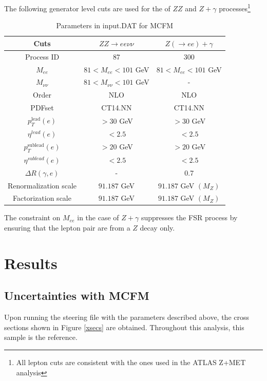 \documentclass[11pt,a4paper,final]{report}
\begin{document}
The following generator level cuts are used for the of $ZZ$ and $Z+\gamma$ processes\footnote{All lepton cuts are consistent with the ones used in the ATLAS Z+MET analysis}
\begin{table}[H]
\begin{center}
	\begin{tabular}{|c|c|c|}
	\hline
	\textbf{Cuts} &$ZZ \rightarrow ee\nu\nu$ & $Z(\rightarrow ee)+\gamma$\\
	\hline
	Process ID & 87 & 300\\
	$M_{ee}$ & $81 < M_{ee} < 101$ GeV & $81 < M_{ee} < 101$ GeV\\
	$M_{\nu\nu}$ & $81 < M_{\nu\nu} < 101$ GeV& -\\
	Order & NLO & NLO\\
	PDFset & CT14.NN & CT14.NN\\
	$p_T^{\text{lead}}(e)$ & $> 30$ GeV & $> 30$ GeV\\
	$\eta^{lead}(e)$ & $< 2.5$ & $< 2.5$\\
	$p_T^{\text{sublead}}(e)$ & $> 20$ GeV & $> 20$ GeV\\
	$\eta^{sublead}(e)$ & $< 2.5$ & $< 2.5$\\
	$\Delta R(\gamma,e)$ & - & 0.7\\
	Renormalization scale & $91.187$ GeV & $91.187$ GeV $(M_{Z})$\\
	Factorization scale & $91.187$ GeV & $91.187$ GeV $(M_{Z})$\\
	\hline
	\end{tabular}
	\caption{Parameters in input.DAT for MCFM}
	\label{table:default}
	\end{center}
\end{table}

The constraint on $M_{ee}$ in the case of $Z+\gamma$ suppresses the FSR process by ensuring that the lepton pair are from a $Z$ decay only.

\section{Results}

\subsection*{Uncertainties with MCFM}
\label{subsec:MCFM_unc}
\setcounter{subsection}{1}
Upon running the steering file with the parameters described above, the cross sections shown in Figure \ref{xsecs} are obtained. Throughout this analysis, this sample is the reference.
\end{document}
